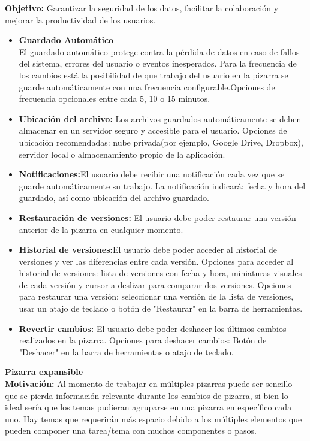 \documentclass[a4paper, oneside, final]{scrartcl}
\begin{document}
    \textbf{Objetivo:} Garantizar la seguridad de los datos, facilitar la colaboración y mejorar la productividad de los usuarios.
   \begin{itemize}
    \item  \textbf{Guardado Automático}\\
    El guardado automático protege contra la pérdida de datos en caso de fallos del sistema, errores del usuario o eventos inesperados. Para la frecuencia de los cambios está la posibilidad de que trabajo del usuario en la pizarra se guarde automáticamente con una frecuencia configurable.Opciones de frecuencia opcionales entre cada 5, 10 o 15 minutos.
    \item \textbf{Ubicación del archivo:} Los archivos guardados automáticamente se deben almacenar en un servidor seguro y accesible para el usuario. Opciones de ubicación recomendadas: nube privada(por ejemplo, Google Drive, Dropbox), servidor local o almacenamiento propio de la aplicación.
    \item \textbf{Notificaciones:}El usuario debe recibir una notificación cada vez que se guarde automáticamente su trabajo. La notificación indicará: fecha y hora del guardado, así como ubicación del archivo guardado.
    \item \textbf{Restauración de versiones:} El usuario debe poder restaurar una versión anterior de la pizarra en cualquier momento.
    \item \textbf{Historial de versiones:}El usuario debe poder acceder al historial de versiones y ver las diferencias entre cada versión. Opciones para acceder al historial de versiones: lista de versiones con fecha y hora, miniaturas visuales de cada versión y cursor a deslizar para comparar dos versiones.
           Opciones para restaurar una versión: seleccionar una versión de la lista de versiones, usar un atajo de teclado o botón de "Restaurar" en la barra de herramientas.
    \item \textbf{Revertir cambios:} El usuario debe poder deshacer los últimos cambios realizados en la pizarra.
           Opciones para deshacer cambios: Botón de "Deshacer" en la barra de herramientas o atajo de teclado.
    \end{itemize}
    
\noindent
\textbf{\large Pizarra expansible}\\ %

\textbf{Motivación:} Al momento de trabajar en múltiples pizarras puede ser sencillo que se pierda información relevante durante los cambios de pizarra, si bien lo ideal sería que los temas pudieran agruparse en una pizarra en específico cada uno. Hay temas que requerirán más espacio debido a los múltiples elementos que pueden componer una tarea/tema con muchos componentes o pasos.
\end{document}
